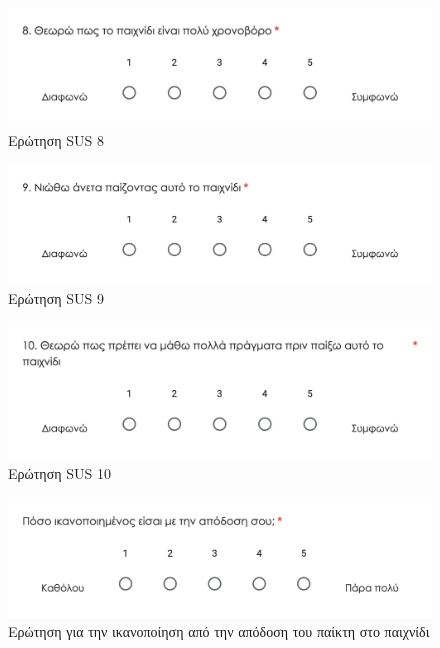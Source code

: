 \begin{figure}[H]
    \centering
    \includegraphics[width=0.8\linewidth]{sections/appendices/b/images/survey_sus_8}
    \caption{Ερώτηση SUS 8}
    \label{fig:survey_sus_8}
\end{figure}

\begin{figure}[H]
    \centering
    \includegraphics[width=0.8\linewidth]{sections/appendices/b/images/survey_sus_9}
    \caption{Ερώτηση SUS 9}
    \label{fig:survey_sus_9}
\end{figure}

\begin{figure}[H]
    \centering
    \includegraphics[width=0.8\linewidth]{sections/appendices/b/images/survey_sus_10}
    \caption{Ερώτηση SUS 10}
    \label{fig:survey_sus_10}
\end{figure}


\begin{figure}[H]
    \centering
    \includegraphics[width=0.8\linewidth]{sections/appendices/b/images/survey_performance_satisfaction}
    \caption{Ερώτηση για την ικανοποίηση από την απόδοση του παίκτη στο παιχνίδι}
    \label{fig:survey_performance_satisfaction}
\end{figure}

